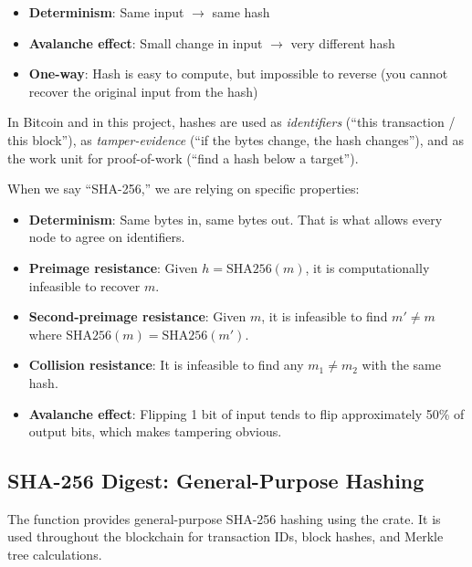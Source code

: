 \begin{itemize}
  \item \textbf{Determinism}: Same input $\to$ same hash
  \item \textbf{Avalanche effect}: Small change in input $\to$ very different hash
  \item \textbf{One-way}: Hash is easy to compute, but impossible to reverse (you cannot recover the original input from the hash)
\end{itemize}

In Bitcoin and in this project, hashes are used as \emph{identifiers} (``this transaction / this block''), as \emph{tamper-evidence} (``if the bytes change, the hash changes''), and as the work unit for proof-of-work (``find a hash below a target'').

When we say ``SHA-256,'' we are relying on specific properties:

\begin{itemize}
  \item \textbf{Determinism}: Same bytes in, same bytes out. That is what allows every node to agree on identifiers.
  \item \textbf{Preimage resistance}: Given $h = \text{SHA256}(m)$, it is computationally infeasible to recover $m$.
  \item \textbf{Second-preimage resistance}: Given $m$, it is infeasible to find $m' \ne m$ where $\text{SHA256}(m) = \text{SHA256}(m')$.
  \item \textbf{Collision resistance}: It is infeasible to find any $m_1 \ne m_2$ with the same hash.
  \item \textbf{Avalanche effect}: Flipping 1 bit of input tends to flip approximately 50\% of output bits, which makes tampering obvious.
\end{itemize}

\subsection{SHA-256 Digest: General-Purpose Hashing}
\label{sec:ch08-sha256-digest}

The  function provides general-purpose SHA-256 hashing using the  crate. It is used throughout the blockchain for transaction IDs, block hashes, and Merkle tree calculations.

